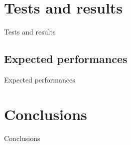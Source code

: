 \documentclass[11pt]{article}
\begin{document}
    \section{Tests and results} \label{sec:tests_and_results}

        Tests and results

        \subsection{Expected performances} \label{subsec:expected_performances}

            Expected performances

    \section{Conclusions} \label{sec:conclusions}

        Conclusions
\end{document}
